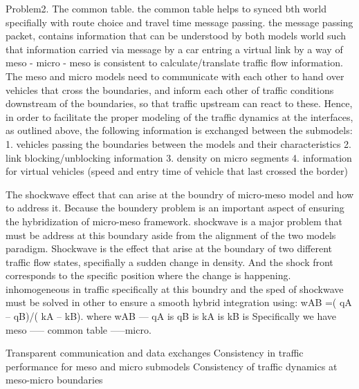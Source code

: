 \begin{bibunit}[plainnat]
Problem2. The common table. the common table helps to synced bth world specifially with route choice and travel time message passing. 
the message passing packet, contains information that can be understood by both models world such that information carried via message by a car entring a virtual link 
by a way of meso - micro - meso is consistent to calculate/translate traffic flow information. 
The meso and micro models need to communicate with each other to hand over vehicles that cross the boundaries,
and inform each other of traffic conditions downstream of the boundaries, so that traffic upstream can react to these.
Hence, in order to facilitate the proper modeling of the traffic dynamics at the interfaces, as outlined above, the
following information is exchanged between the submodels:
1. vehicles passing the boundaries between the models and their characteristics
2. link blocking/unblocking information
3. density on micro segments
4. information for virtual vehicles (speed and entry time of vehicle that last crossed the border)



The shockwave effect that can arise at the boundry of micro-meso model and how to address it. 
Because the boundery problem is an important aspect of ensuring the hybridization of micro-meso framework. shockwave
is a major problem that must be address at this boundary aside from the alignment of the two models paradigm. Shockwave is the 
effect that arise at the boundary of two different traffic flow states, specifially a sudden change in density. And the shock front corresponds to the 
specific position where the change is happening. inhomogeneous in traffic specifically at this boundry and the sped of shockwave must be solved in other to ensure a 
smooth hybrid integration using: wAB =( qA – qB)/( kA – kB).
where wAB   --- 
qA  is 
qB  is 
kA  is 
kB  is 
Specifically we have meso ----- common table -----micro.

Transparent communication and data exchanges
Consistency in traffic performance for meso and micro submodels
Consistency of traffic dynamics at meso-micro boundaries



\end{bibunit}
